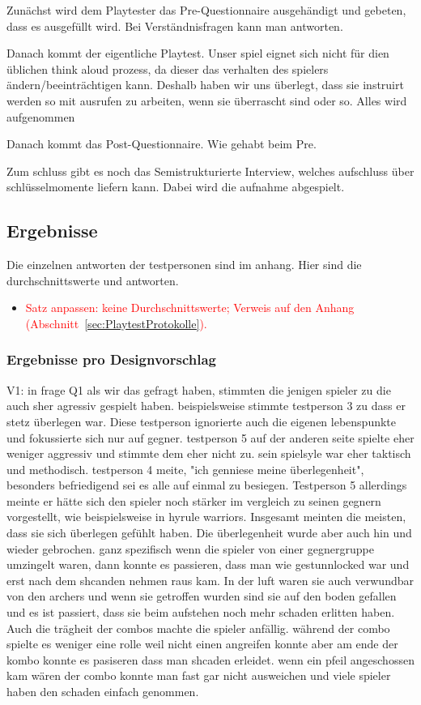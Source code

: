 \documentclass[../Main.tex]{subfiles}
\begin{document}
Zunächst wird dem Playtester das Pre-Questionnaire ausgehändigt und gebeten, dass es ausgefüllt wird. Bei Verständnisfragen kann man antworten.

Danach kommt der eigentliche Playtest. Unser spiel eignet sich nicht für dien üblichen think aloud prozess, da dieser das verhalten des spielers ändern/beeinträchtigen kann. Deshalb haben wir uns überlegt, dass sie instruirt werden so mit ausrufen zu arbeiten, wenn sie überrascht sind oder so. Alles wird aufgenommen

Danach kommt das Post-Questionnaire. Wie gehabt beim Pre.

Zum schluss gibt es noch das Semistrukturierte Interview, welches aufschluss über schlüsselmomente liefern kann. Dabei wird die aufnahme abgespielt.

\subsection{Ergebnisse}
Die einzelnen antworten der testpersonen sind im anhang. Hier sind die durchschnittswerte und antworten.

\begin{itemize}[leftmargin=1.5cm]
    \item \textcolor{red}{Satz anpassen: keine Durchschnittswerte; Verweis auf den Anhang (Abschnitt~\ref{sec:PlaytestProtokolle}).}
\end{itemize}

\subsubsection{Ergebnisse pro Designvorschlag} \label{sec:ErgVorschlag}

V1: in frage Q1 als wir das gefragt haben, stimmten die jenigen spieler zu die auch sher agressiv gespielt haben. beispielsweise stimmte testperson 3 zu dass er stetz überlegen war. Diese testperson ignorierte auch die eigenen lebenspunkte und fokussierte sich nur auf gegner. testperson 5 auf der anderen seite spielte eher weniger aggressiv und stimmte dem eher nicht zu. sein spielsyle war eher taktisch und methodisch. testperson 4 meite, "ich genniese meine überlegenheit", besonders befriedigend sei es alle auf einmal zu besiegen. Testperson 5 allerdings meinte er hätte sich den spieler noch stärker im vergleich zu seinen gegnern vorgestellt, wie beispielsweise in hyrule warriors. Insgesamt meinten die meisten, dass sie sich überlegen gefühlt haben.
Die überlegenheit wurde aber auch hin und wieder gebrochen. ganz spezifisch wenn die spieler von einer gegnergruppe umzingelt waren, dann konnte es passieren, dass man wie gestunnlocked war und erst nach dem shcanden nehmen raus kam. In der luft waren sie auch verwundbar von den archers und wenn sie getroffen wurden sind sie auf den boden gefallen und es ist passiert, dass sie beim aufstehen noch mehr schaden erlitten haben. Auch die trägheit der combos machte die spieler anfällig. während der combo spielte es weniger eine rolle weil nicht einen angreifen konnte aber am ende der kombo konnte es pasiseren dass man shcaden erleidet. wenn ein pfeil angeschossen kam wären der combo konnte man fast gar nicht ausweichen und viele spieler haben den schaden einfach genommen.
\end{document}
